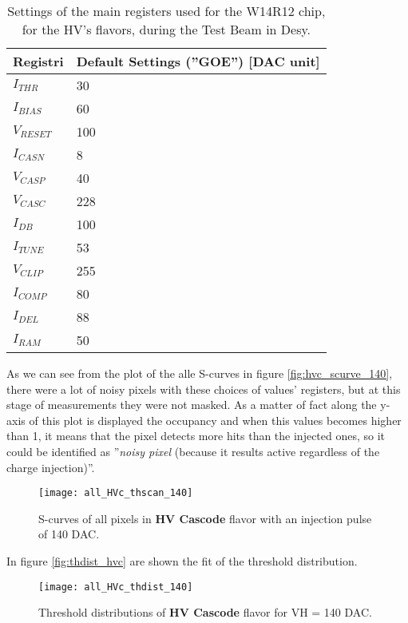 \begin{table}[h!]
\centering
\begin{tabular}{>{} C{3.5cm}|C{3.5cm}}
Registri & Default Settings (''GOE'') [DAC unit]\\
\hline
$I_{THR}$ & 30 \\
\hline
$I_{BIAS}$ & 60 \\
\hline
$V_{RESET}$ & 100 \\
\hline
$I_{CASN}$ & 8 \\
\hline
$V_{CASP}$ & 40 \\
\hline
$V_{CASC}$ & 228 \\
\hline
$I_{DB}$ & 100 \\
\hline
$I_{TUNE}$ & 53 \\
\hline
$V_{CLIP}$ & 255 \\
\hline
$I_{COMP}$ & 80 \\
\hline
$I_{DEL}$ & 88 \\
\hline
$I_{RAM}$ & 50 \\
\hline
\end{tabular}
\caption{Settings of the main registers used for the W14R12 chip, for the HV's flavors, during the Test Beam in Desy.}
\label{tab:tb_hv_settings}
\end{table}

As we can see from the plot of the alle S-curves in figure \vref{fig:hvc_scurve_140}, there were a lot of noisy pixels with these choices of values' registers, but at this stage of measurements they were not masked.
As a matter of fact along the y-axis of this plot is displayed the occupancy and when this values becomes higher than 1, it means that the pixel detects more hits than the injected ones, so it could be identified as ''\textit{noisy pixel} (because it results active regardless of the charge injection)''.


\begin{figure}[h!]
\centering
\texttt{[image: all\_HVc\_thscan\_140]}
\caption{S-curves of all pixels in \textbf{HV Cascode} flavor with an injection pulse of 140 DAC.}
\label{fig:hvc_scurve_140}
\end{figure}

In figure \vref{fig:thdist_hvc} are shown the fit of the threshold distribution.

\begin{figure}[h!]
\centering
\texttt{[image: all\_HVc\_thdist\_140]}
\caption{Threshold distributions of \textbf{HV Cascode} flavor for VH = 140 DAC.}
\label{fig:thdist_hvc}
\end{figure}



